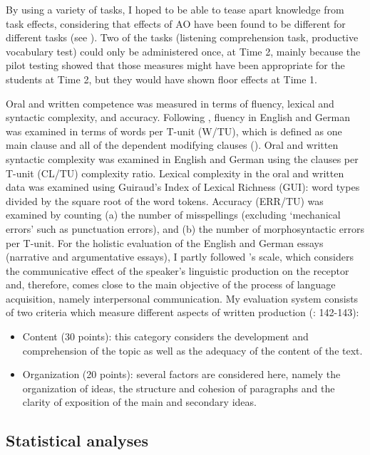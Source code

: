 \documentclass[output=paper,modfonts,nonflat,newtxmath]{langsci/langscibook}
\begin{document}
By using a variety of tasks, I hoped to be able to tease apart knowledge from task effects, considering that effects of AO have been found to be different for different tasks (see \citealt{Pfenninger2017}). Two of the tasks (listening comprehension task, productive vocabulary test) could only be administered once, at Time 2, mainly because the pilot testing showed that those measures might have been appropriate for the students at Time 2, but they would have shown floor effects at Time 1.


Oral and written competence was measured in terms of fluency, lexical and syntactic complexity, and accuracy. Following \citet{Wolfe-QuinteroEtAl1998}, fluency in English and German was examined in terms of words per T-unit (W/TU), which is defined as one main clause and all of the dependent modifying clauses (\citealt{EllisBarkhuizen2005}). Oral and written syntactic complexity was examined in English and German using the clauses per T-unit (CL/TU) complexity ratio. Lexical complexity in the oral and written data was examined using Guiraud’s Index of Lexical Richness (GUI): word types divided by the square root of the word tokens. Accuracy (ERR/TU) was examined by counting (a) the number of misspellings (excluding ‘mechanical errors’ such as punctuation errors), and (b) the number of morphosyntactic errors per T-unit. For the holistic evaluation of the English and German essays (narrative and argumentative essays), I partly followed \citealt{JacobsEtAl1981}'s scale, which considers the communicative effect of the speaker’s linguistic production on the receptor and, therefore, comes close to the main objective of the process of language acquisition, namely interpersonal communication. My evaluation system consists of two criteria which measure different aspects of written production (\citealt{LasagabasterEtAl2003}: 142-143):


\begin{itemize}
\item
Content (30 points): this category considers the development and comprehension of the topic as well as the adequacy of the content of the text.

\item
Organization (20 points): several factors are considered here, namely the organization of ideas, the structure and cohesion of paragraphs and the clarity of exposition of the main and secondary ideas.

\end{itemize}

\subsection{Statistical analyses}
\end{document}
